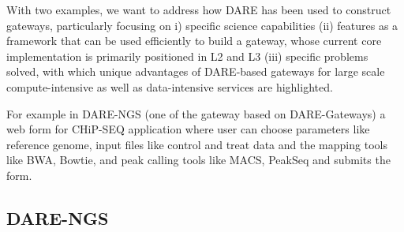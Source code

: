 \documentclass[]{svjour3}
\begin{document}
With two examples, we want to address how DARE has been used to
construct gateways, particularly focusing on i) specific science
capabilities (ii) features as a framework that can be used efficiently
to build a gateway, whose current core implementation is primarily
positioned in L2 and L3 (iii) specific problems solved, with which
unique advantages of DARE-based gateways for large scale
compute-intensive as well as data-intensive services are highlighted.


For example in DARE-NGS (one of the gateway based on DARE-Gateways) a
web form for CHiP-SEQ application where user can choose parameters
like reference genome, input files like control and treat data and the
mapping tools like BWA, Bowtie, and peak calling tools like MACS,
PeakSeq and submits the form.

\subsection{DARE-NGS}
\end{document}
